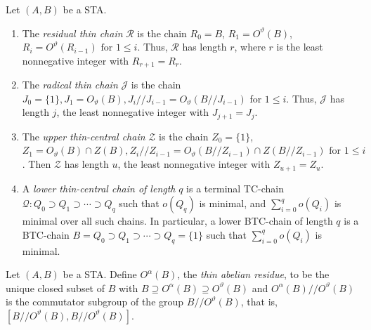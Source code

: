 \documentclass[ALCO,ThmDefs,Unicode,epreuves]{cedram}
\begin{document}
\begin{defi}
\label{def:ptc_chains} 
Let $(A, B)$ be a STA.
\begin{enumerate}[label = (\roman*)] 
\item\label{defi1.11_i} The \emph{residual thin 
chain} $
\mathcal{R}$ is the chain $R_0 = B$, $R_1 =
O^{\vartheta}(B)$, $R_i = O^{\vartheta}(R_{i-1}) \mbox{ for }1 \leq i$. 
Thus, $\mathcal{R}$ has length $r$, where $r$ is the least nonnegative
integer with $R_{r+1} = R_r$.
\item\label{defi1.11_ii} The \emph{radical thin chain} $\mathcal{J}$ is the chain $J_0 = \{1\}, J_1 =
O_{\vartheta}(B), J_i//J_{i-1} = O_{\vartheta}(B//J_{i-1})$ for $1
\leq i$. Thus, $\mathcal{J}$ has length $j$, the least nonnegative
integer with $J_{j+1} = J_j$.
\item\label{defi1.11_iii} The \emph{upper thin-central chain} $\mathcal{Z}$ is the chain $Z_0 = \{1\}$, $
Z_1 = O_{\vartheta}(B) \cap Z(B), Z_i//Z_{i-1} =
O_{\vartheta}(B//Z_{i-1}) \cap Z(B//Z_{i-1}) \mbox{ for }1 \leq i$. Then
$\mathcal{Z}$ has length $u$, the least nonnegative integer with
$Z_{u+1} = Z_u$.
\item\label{defi1.11_iv} A \emph{lower thin-central chain of length} $q$ is a terminal TC-chain $\mathcal{Q}:
Q_0 \supset Q_1 \supset \cdots \supset Q_q$ 
such that $o(Q_q)$ is minimal, and $\sum_{i=0}^qo(Q_i)$ is 
minimal over all such chains. In particular, a lower \mbox{BTC-}chain
 of length $q$ is a BTC-chain $B = Q_0 \supset Q_1 \supset \cdots \supset
Q_q = \{1\}$ such that $\sum_{i=0}^qo(Q_i)$ is minimal. 
\end{enumerate}
\end{defi}

\begin{defi}
\label{def:abel_res}
Let $(A, B)$ be a STA. Define $O^{\alpha}(B)$, the \emph{thin abelian
residue}, to be the unique closed subset of $B$ with $B \supseteq
O^{\alpha}(B) \supseteq O^{\vartheta}(B)$ and
$O^{\alpha}(B)//O^{\vartheta}(B)$ is the commutator subgroup of the group
$B//O^{\vartheta}(B)$, that is, $[B//O^{\vartheta}(B),
B//O^{\vartheta}(B)]$. 
\end{defi}
 
\end{document}
